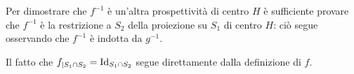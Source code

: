 	\par Per dimostrare che $f^{-1}$ \`e un'altra prospettivit\`a di centro $H$ \`e sufficiente provare che $f^{-1}$ \`e la restrizione a $S_2$ della proiezione su $S_1$ di centro $H$: ci\`o segue osservando che $f^{-1}$ \`e indotta da $g^{-1}$.
	\par Il fatto che $f_{|S_1 \cap S_2} = \Identity_{S_1 \cap S_2}$ segue direttamente dalla definizione di $f$. \EndProof
